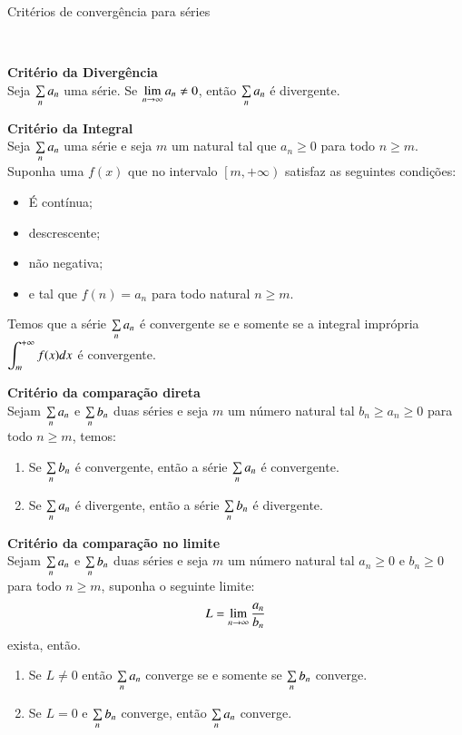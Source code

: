 		\begin{center}
		\begin{Huge}
			Critérios de convergência para séries
		\end{Huge}\\		
		\hrulefill
	\end{center}			

	\textbf{Critério da Divergência} \\
Seja $\sum\limits_n a_n$ uma série. Se $\displaystyle\lim_{n \to \infty} a_n \ne 0$, então $\sum\limits_n a_n$ é divergente. \newspaceline

\textbf{Critério da Integral}\\
Seja $\sum\limits_n a_n$ uma série e seja $m$ um natural tal que $a_n\ge0$ para todo $n\ge m$. Suponha uma $f(x)$ que no intervalo $\left[m,+\infty\right)$ satisfaz as seguintes condições:
\begin{itemize}[noitemsep, nolistsep]
	\item É contínua;
	\item descrescente;
	\item não negativa;
	\item e tal que $f(n)=a_n$ para todo natural $n\ge m$.
\end{itemize}
Temos que a série $\sum\limits_n a_n$ é convergente se e somente se a integral imprópria $\displaystyle\int_m^{+\infty}f(x)dx$ é convergente. \newspaceline

\textbf{Critério da comparação direta}\\
Sejam $\sum\limits_n a_n$ e $\sum\limits_n b_n$ duas séries e seja $m$ um número natural tal $b_n\ge a_n \ge 0$ para todo $n\ge m$, temos:
\begin{enumerate}
	\item  Se $\sum\limits_n b_n$ é convergente, então a série $\sum\limits_n a_n$ é convergente.
	\item Se $\sum\limits_n a_n$ é divergente, então a série $\sum\limits_n b_n$ é divergente.
\end{enumerate}
\vspace{5pt}

\textbf{Critério da comparação no limite}\\
Sejam $\sum\limits_n a_n$ e $\sum\limits_n b_n$ duas séries e seja $m$ um número natural tal $a_n\ge 0$ e $ b_n \ge 0$ para todo $n\ge m$, suponha o seguinte limite:
$$L = \displaystyle\lim_{n\to\infty}\dfrac{a_n}{b_n}$$
exista, então.
\begin{enumerate}
	\item Se $L\ne 0$ então $\sum\limits_n a_n$ converge se e somente se $\sum\limits_n b_n$ converge.
	\item Se $L=0$ e $\sum\limits_n b_n$ converge, então $\sum\limits_n a_n$ converge.
\end{enumerate}

